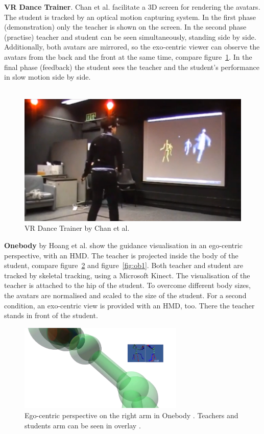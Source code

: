 \textbf{VR Dance Trainer}. Chan et al. \cite{Chan2010} facilitate a 3D screen for rendering the avatars. The student is tracked by an optical motion capturing system. In the first phase (demonstration) only the teacher is shown on the screen. In the second phase (practise) teacher and student can be seen simultaneously, standing side by side. Additionally, both avatars are mirrored, so the exo-centric viewer can observe the avatars from the back and the front at the same time, compare figure~\ref{fig:vrdtPerspectives}. In the final phase (feedback) the student sees the teacher and the student's performance in slow motion side by side.\\ \\
\begin{figure}
	\centering
	\includegraphics[width=1.0\textwidth]{img/VRDanceTrainerPerspective.png}
	\caption{VR Dance Trainer by Chan et al. \cite{Chan2010}}
	\label{fig:vrdtPerspectives}
\end{figure}
\textbf{Onebody} by Hoang et al. \cite{Hoang2016} show the guidance visualisation in an ego-centric perspective, with an HMD. The teacher is projected inside the body of the student, compare figure~\ref{fig:obEgoPersp} and figure~\ref{fig:ob1}. Both teacher and student are tracked by skeletal tracking, using a Microsoft Kinect. The visualisation of the teacher is attached to the hip of the student. To overcome different body sizes, the avatars are normalised and scaled to the size of the student. For a second condition, an exo-centric view is provided with an HMD, too. There the teacher stands in front of the student.
\begin{figure}[h!]
	\centering
	\includegraphics[width=0.7\textwidth]{img/OneBody_ego_persp.png}
	\caption{Ego-centric perspective on the right arm in Onebody \cite{Hoang2016}. Teachers and students arm can be seen in overlay \cite{Hoang2016}.}
	\label{fig:obEgoPersp}
\end{figure}
